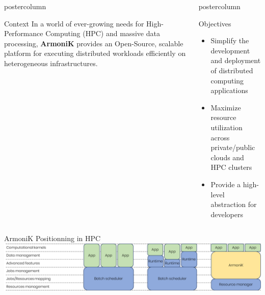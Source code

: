 \begin{frame}[fragile]

  \begin{columns}[T]
    \begin{column}{.49\textwidth}
      \begin{beamercolorbox}[center,wd=\textwidth]{postercolumn}
        \begin{minipage}[T]{.96\textwidth}
            \begin{block}{Context}
              In a world of ever-growing needs for High-Performance Computing (HPC) and massive data processing, \textbf{ArmoniK} provides an Open-Source, scalable platform for executing distributed workloads efficiently on heterogeneous infrastructures.
            \end{block}
        \end{minipage}
      \end{beamercolorbox}
      \vfill
    \end{column}
    \begin{column}{.49\textwidth}
      \begin{beamercolorbox}[center,wd=\textwidth]{postercolumn}
        \begin{minipage}[T]{.96\textwidth}
              \begin{block}{Objectives}
                \begin{itemize}
                  \item Simplify the development and deployment of distributed computing applications
                  \item Maximize resource utilization across private/public clouds and HPC clusters
                  \item Provide a high-level abstraction for developers
                \end{itemize}
              \end{block}
        \end{minipage}
      \end{beamercolorbox}
    \end{column}
  \end{columns}

  \begin{center}
  \begin{minipage}[T]{.975\textwidth}
  \begin{block}{ArmoniK Positionning in HPC}
    \centering
    \includegraphics[width=.85\textwidth]{hpc-orchestrators.png}            
  \end{block}
  \end{minipage}
  \end{center}


\end{frame}
